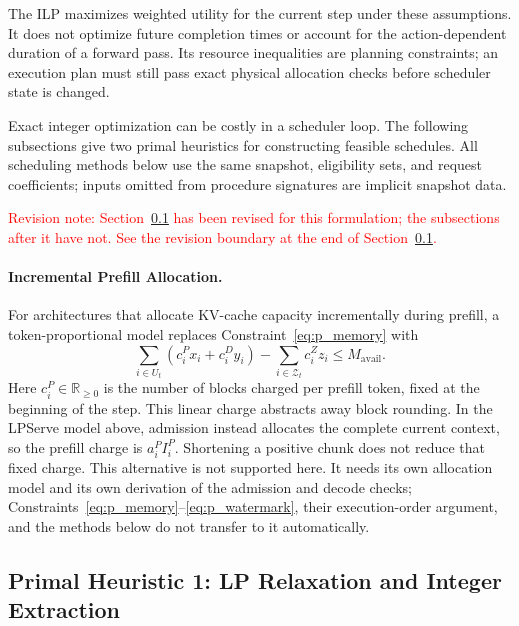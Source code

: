 \documentclass[11pt]{article}
\begin{document}
The ILP maximizes weighted utility for the current step under these assumptions. It does not optimize future completion times or account for the action-dependent duration of a forward pass. Its resource inequalities are planning constraints; an execution plan must still pass exact physical allocation checks before scheduler state is changed.

Exact integer optimization can be costly in a scheduler loop. The following subsections give two primal heuristics for constructing feasible schedules. All scheduling methods below use the same snapshot, eligibility sets, and request coefficients; inputs omitted from procedure signatures are implicit snapshot data.

\textcolor{red}{Revision note: Section~\ref{subsec:lp_relaxation} has been revised for this formulation; the subsections after it have not. See the revision boundary at the end of Section~\ref{subsec:lp_relaxation}.}

\paragraph{Incremental Prefill Allocation.}
For architectures that allocate KV-cache capacity incrementally during prefill, a token-proportional model replaces Constraint~\ref{eq:p_memory} with
\[
\sum_{i\in U_t}(c_i^P x_i+c_i^D y_i)
-\sum_{i\in\mathcal{Z}_t}c_i^Z z_i
\le M_{\mathrm{avail}}.
\]
Here \(c_i^P\in\mathbb{R}_{\ge0}\) is the number of blocks charged per prefill token, fixed at the beginning of the step. This linear charge abstracts away block rounding. In the LPServe model above, admission instead allocates the complete current context, so the prefill charge is \(a_i^P I_i^P\). Shortening a positive chunk does not reduce that fixed charge. This alternative is not supported here. It needs its own allocation model and its own derivation of the admission and decode checks; Constraints~\ref{eq:p_memory}--\ref{eq:p_watermark}, their execution-order argument, and the methods below do not transfer to it automatically.

\subsection{Primal Heuristic 1: LP Relaxation and Integer Extraction}
\label{subsec:lp_relaxation}
\end{document}
